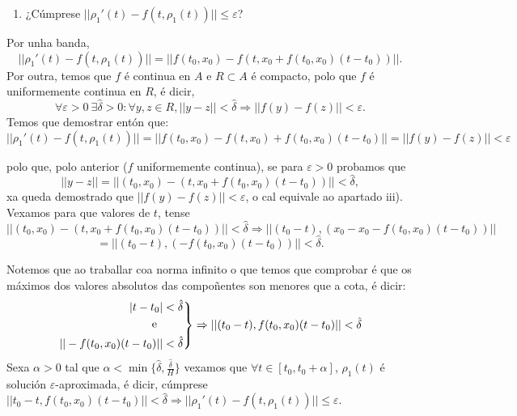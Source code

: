 \documentclass[11pt, a4paper,twoside]{article}
\makeatletter
\theoremstyle{theorem-style}  %
\renewenvironment{proof}[1][\proofname]{\par
	\pushQED{\qed}%
	\normalfont \topsep6\p@\@plus6\p@\relax
	\list{}{%
		\settowidth{\leftmargin}{\quad:\hskip\labelsep}%
		\setlength{\labelwidth}{0pt}%
		\setlength{\itemindent}{-\leftmargin}%
	}%
	\item[\hskip\labelsep\itshape#1\@addpunct{:}]\ignorespaces
}{%
	\popQED\endlist\@endpefalse
}
\theoremstyle{definition-style}
\theoremstyle{example-style}
\newenvironment{rcases}
{\left.\begin{aligned}}
	{\end{aligned}\right\rbrace}
\makeatother
\begin{document}
\begin{proof}
\begin{enumerate}[\qquad i)]
		\item ¿Cúmprese $ ||\rho_1'(t)-f(t,\rho_1(t))||\leq \varepsilon $?
	\end{enumerate}
	
	Por unha banda,  \[||\rho_1'(t)-f(t,\rho_1(t))||=||f(t_0,x_0)-f(t,x_0+f(t_0,x_0)(t-t_0))|| .\]
	Por outra, temos que $f$ é continua en $A$ e $R\subset A$ é compacto, polo que $f$ é uniformemente continua en $R$, é dicir, 
	\[\forall \varepsilon > 0 \ \exists \hat{\delta} >0 : \forall y,z \in R, ||y-z||<\hat{\delta} \Rightarrow||f(y)-f(z)||<\varepsilon .\]
	Temos que demostrar entón que:  \[||\rho_1'(t)-f(t,\rho_1(t))||=||f(t_0,x_0)-f(t,x_0)+f(t_0,x_0)(t-t_0)||=||f(y)-f(z)||<\varepsilon \]
	
	polo que, polo anterior ($ f $ uniformemente continua), se para $ \varepsilon>0 $ probamos que 
	\[||y-z||=||(t_0,x_0)-(t, x_0+f(t_0,x_0)(t-t_0))||< \hat{\delta}, \]
	xa queda demostrado que $ ||f(y)-f(z)||<\varepsilon $, o cal equivale ao apartado iii). Vexamos para que valores de $ t $, tense 
	\[||(t_0,x_0)-(t, x_0+f(t_0,x_0)(t-t_0))||< \hat{\delta} \Rightarrow ||(t_0-t),( x_0-x_0 -f(t_0,x_0)(t-t_0))||\]
	\[=||(t_0-t),(-f(t_0,x_0)(t-t_0))||< \hat{\delta} .\]
	
	Notemos que ao traballar coa norma infinito o que temos que comprobar é que os máximos dos valores absolutos das compoñentes son menores que a cota, é dicir:	
	\[ \begin{rcases}
	 |t-t_0|< \hat{\delta}\\
	 \text{ e }\qquad\\
	|| -f(t_0,x_0)(t-t_0)||< \hat{\delta}
	\end{rcases} \Rightarrow ||(t_0-t), f(t_0,x_0)(t-t_0)||< \hat{\delta} \]
	Sexa $ \alpha >0 $ tal que $ \alpha < \min \{ \hat{\delta}, \frac{\hat{\delta}}{H}\} $ vexamos que $ \forall t \in [t_0,t_0+\alpha] $, $\rho_1(t)$ é solución $ \varepsilon $-aproximada, é dicir, cúmprese $ ||t_0-t,f(t_0,x_0)(t-t_0)||< \hat{\delta}\Rightarrow ||\rho_1'(t)-f(t,\rho_1(t))||\leq \varepsilon $.
	

\end{proof}
\end{document}
